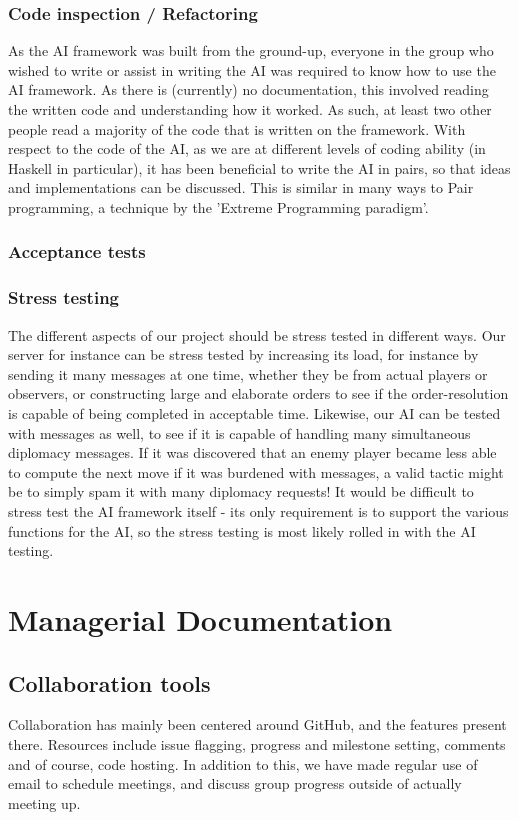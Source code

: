 \documentclass[11pt]{article}
\begin{document}
\subsubsection{Code inspection / Refactoring}
As the AI framework was built from the ground-up, everyone in the group who
wished to write or assist in writing the AI was required to know how to use the
AI framework. As there is (currently) no documentation, this involved reading
the written code and understanding how it worked. As such, at least two other 
people read a majority of the code that is written on the framework. With 
respect to the code of the AI, as we are at different levels of coding ability 
(in Haskell in particular), it has been beneficial to write the AI in pairs, so
that ideas and implementations can be discussed. This is similar in many ways to
Pair programming, a technique by the 'Extreme Programming paradigm'.

\subsubsection{Acceptance tests}


\subsubsection{Stress testing}
The different aspects of our project should be stress tested in different ways.
Our server for instance can be stress tested by increasing its load, for 
instance by sending it many messages at one time, whether they be from actual
players or observers, or constructing large and elaborate orders to see if the
order-resolution is capable of being completed in acceptable time. Likewise, our
AI can be tested with messages as well, to see if it is capable of handling many
simultaneous diplomacy messages. If it was discovered that an enemy player 
became less able to compute the next move if it was burdened with messages, a 
valid tactic might be to simply spam it with many diplomacy requests! It would
be difficult to stress test the AI framework itself - its only requirement is to
support the various functions for the AI, so the stress testing is most likely
rolled in with the AI testing. 

\section{Managerial Documentation}

\subsection{Collaboration tools}
Collaboration has mainly been centered around GitHub, and the features present
there. Resources include issue flagging, progress and milestone setting, comments 
and of course, code hosting. In addition to this, we have made regular use of 
email to schedule meetings, and discuss group progress outside of actually 
meeting up.
\end{document}

